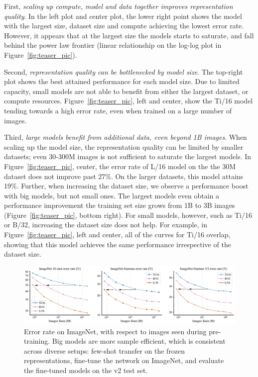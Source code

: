 First, \textit{scaling up compute, model and data together improves representation quality}.
In the left plot and center plot, the lower right point shows the model with the largest size, dataset size and compute achieving the lowest error rate.
However, it appears that at the largest size the models starts to saturate, and fall behind the power law frontier (linear relationship on the log-log plot in Figure~\ref{fig:teaser_pic}).

Second, \textit{representation quality can be bottlenecked by model size}. 
The top-right plot shows the best attained performance for each model size. 
Due to limited capacity, small models are not able to benefit from either the largest dataset, or compute resources.
Figure~\ref{fig:teaser_pic}, left and center, show the Ti/16 model tending towards a high error rate, even when trained on a large number of images.

Third, \textit{large models benefit from additional data, even beyond 1B images}. 
When scaling up the model size, the representation quality can be limited by smaller datasets; even 30-300M images is not sufficient to saturate the largest models.
In Figure~\ref{fig:teaser_pic}, center, the error rate of L/16 model on the the 30M dataset does not improve past 27\%.
On the larger datasets, this model attains 19\%.
Further, when increasing the dataset size, we observe a performance boost with big models, but not small ones.
The largest models even obtain a performance improvement the training set size grows from 1B to 3B images (Figure~\ref{fig:teaser_pic}, bottom right).
For small models, however, such as Ti/16 or B/32, increasing the dataset size does not help.
For example, in Figure~\ref{fig:teaser_pic}, left and center, all of the curves for Ti/16 overlap, showing that this model achieves the same performance irrespective of the dataset size.

\begin{figure}[t]
  \begin{center}
    \includegraphics[width=\linewidth]{figs/sample_efficiency_transfer.pdf}
  \end{center}
  \caption{Error rate on ImageNet, with respect to images seen during pre-training. Big models are more sample efficient, which is consistent across diverse setups: few-shot transfer on the frozen representations, fine-tune the network on ImageNet, and evaluate the fine-tuned models on the v2 test set.}
  \label{fig:sample_efficiency}
\end{figure}

